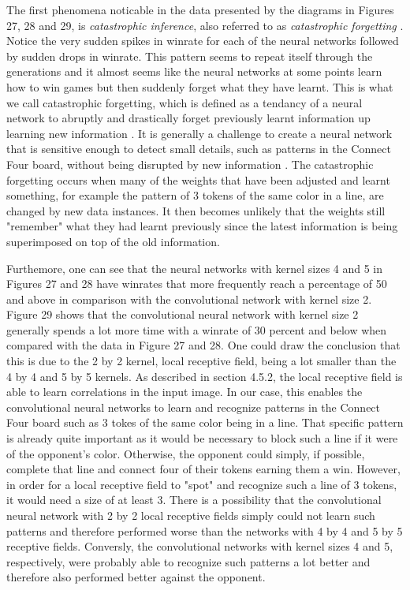 \documentclass[titlepage]{article}
\begin{document}
\vskip 0.2cm

\noindent
The first phenomena noticable in the data presented by the diagrams in Figures 27, 28 and 29, is \emph{catastrophic inference}, also referred to as \emph{catastrophic forgetting} \cite{catastrophic}. Notice the very sudden spikes in winrate for each of the neural networks followed by sudden drops in winrate. This pattern seems to repeat itself through the generations and it almost seems like the neural networks at some points learn how to win games but then suddenly forget what they have learnt. This is what we call catastrophic forgetting, which is defined as a tendancy of a neural network to abruptly and drastically forget previously learnt information up learning new information \cite{catastrophic}. It is generally a challenge to create a neural network that is sensitive enough to detect small details, such as patterns in the Connect Four board, without being disrupted by new information \cite{catastrophic}. The catastrophic forgetting occurs when many of the weights that have been adjusted and learnt something, for example the pattern of 3 tokens of the same color in a line, are changed by new data instances. It then becomes unlikely that the weights still "remember" what they had learnt previously since the latest information is being superimposed on top of the old information.

\vskip 0.2cm

\noindent
Furthemore, one can see that the neural networks with kernel sizes 4 and 5 in Figures 27 and 28 have winrates that more frequently reach a percentage of 50 and above in comparison with the convolutional network with kernel size 2. Figure 29 shows that the convolutional neural network with kernel size 2 generally spends a lot more time with a winrate of 30 percent and below when compared with the data in Figure 27 and 28. One could draw the conclusion that this is due to the 2 by 2 kernel, local receptive field, being a lot smaller than the 4 by 4 and 5 by 5 kernels. As described in section 4.5.2, the local receptive field is able to learn correlations in the input image. In our case, this enables the convolutional neural networks to learn and recognize patterns in the Connect Four board such as 3 tokes of the same color being in a line. That specific pattern is already quite important as it would be necessary to block such a line if it were of the opponent's color. Otherwise, the opponent could simply, if possible, complete that line and connect four of their tokens earning them a win. However, in order for a local receptive field to "spot" and recognize such a line of 3 tokens, it would need a size of at least 3. There is a possibility that the convolutional neural network with 2 by 2 local receptive fields simply could not learn such patterns and therefore performed worse than the networks with 4 by 4 and 5 by 5 receptive fields. Conversly, the convolutional networks with kernel sizes 4 and 5, respectively, were probably able to recognize such patterns a lot better and therefore also performed better against the opponent.
\end{document}
